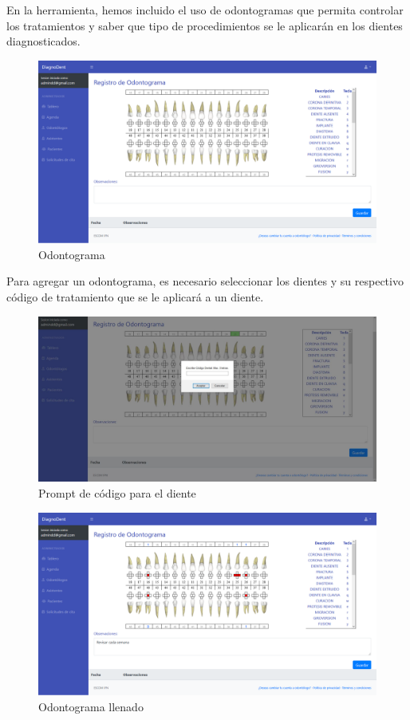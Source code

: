 En la herramienta, hemos incluido el uso de odontogramas que permita controlar los tratamientos y saber que tipo de procedimientos se le aplicarán en los dientes diagnosticados.

\begin{figure}[H]
\centering
\includegraphics[width=17cm,keepaspectratio]{pictures/adminodo/pacientes/odontograma/mu-lista-odontograma-vacio.png}
\caption{Odontograma}
\end{figure}

Para agregar un odontograma, es necesario seleccionar los dientes y su respectivo código de tratamiento que se le aplicará a un diente.

\begin{figure}[H]
\centering
\includegraphics[width=17cm,keepaspectratio]{pictures/adminodo/pacientes/odontograma/mu-lista-odontograma-codigo.JPG}
\caption{Prompt de código para el diente}
\end{figure}

\begin{figure}[H]
\centering
\includegraphics[width=17cm,keepaspectratio]{pictures/adminodo/pacientes/odontograma/mu-lista-odontograma-lleno.png}
\caption{Odontograma llenado}
\end{figure}

